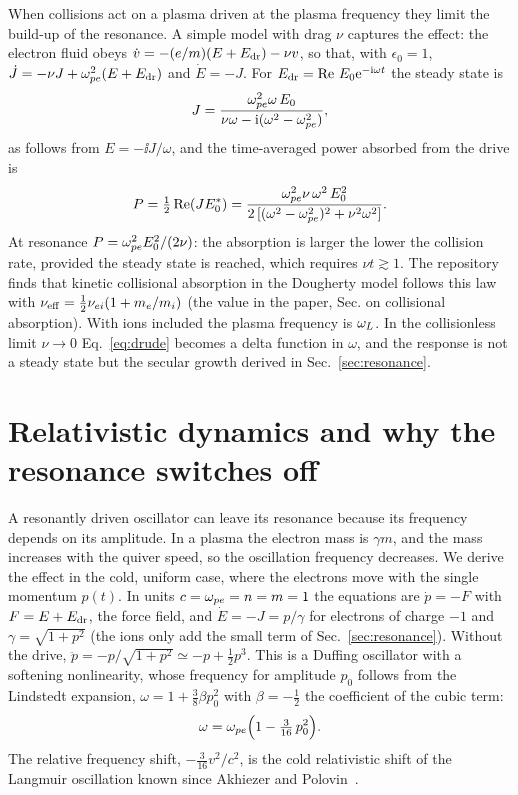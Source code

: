 When collisions act on a plasma driven at the plasma frequency they limit the build-up of the resonance. A simple model with drag $\nu$ captures the effect: the electron fluid obeys $\dot v=-(e/m)(E+E_{\rm dr})-\nu v$, so that, with $\epsilon_0=1$, $\dot J=-\nu J+\omega_{pe}^2(E+E_{\rm dr})$ and $\dot E=-J$. For $E_{\rm dr}=\operatorname{Re}\,E_0\mathrm{e}^{-\mathrm{i}\omega t}$ the steady state is
\begin{equation}
J=\frac{\omega_{pe}^2\omega\,E_0}{\nu\omega-\mathrm{i}(\omega^2-\omega_{pe}^2)} ,
\end{equation}
as follows from $E=-\ii J/\omega$, and the time-averaged power absorbed from the drive is
\begin{equation}
P=\tfrac12\operatorname{Re}(JE_0^*)=\frac{\omega_{pe}^2\nu\,\omega^2\,E_0^2}{2\,[(\omega^2-\omega_{pe}^2)^2+\nu^2\omega^2]} .\label{eq:drude}
\end{equation}
At resonance $P=\omega_{pe}^2E_0^2/(2\nu)$: the absorption is larger the lower the collision rate, provided the steady state is reached, which requires $\nu t\gtrsim1$. The repository finds that kinetic collisional absorption in the Dougherty model follows this law with $\nu_{\rm eff}=\tfrac12\nu_{ei}(1+m_e/m_i)$ (the value in the paper, Sec. on collisional absorption). With ions included the plasma frequency is $\omega_L$. In the collisionless limit $\nu\to0$ Eq.~\eqref{eq:drude} becomes a delta function in $\omega$, and the response is not a steady state but the secular growth derived in Sec.~\ref{sec:resonance}.

\section{Relativistic dynamics and why the resonance switches off}\label{sec:relativistic}

A resonantly driven oscillator can leave its resonance because its frequency depends on its amplitude. In a plasma the electron mass is $\gamma m$, and the mass increases with the quiver speed, so the oscillation frequency decreases. We derive the effect in the cold, uniform case, where the electrons move with the single momentum $p(t)$. In units $c=\omega_{pe}=n=m=1$ the equations are $\dot p=-F$ with $F=E+E_{\rm dr}$, the force field, and $\dot E=-J=p/\gamma$ for electrons of charge $-1$ and $\gamma=\sqrt{1+p^2}$ (the ions only add the small term of Sec.~\ref{sec:resonance}). Without the drive, $\ddot p=-p/\sqrt{1+p^2}\simeq-p+\tfrac12p^3$. This is a Duffing oscillator with a softening nonlinearity, whose frequency for amplitude $p_0$ follows from the Lindstedt expansion, $\omega=1+\tfrac38\beta p_0^2$ with $\beta=-\tfrac12$ the coefficient of the cubic term:
\begin{equation}
\omega=\omega_{pe}\Big(1-\tfrac{3}{16}\,p_0^2\Big) .\label{eq:duffing}
\end{equation}
The relative frequency shift, $-\tfrac3{16}v^2/c^2$, is the cold relativistic shift of the Langmuir oscillation known since Akhiezer and Polovin~\citep{AkhiezerPolovin1956}.


